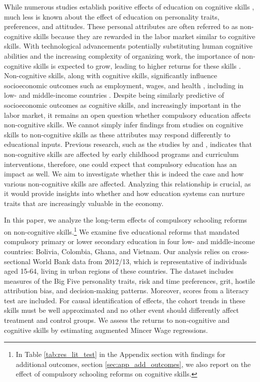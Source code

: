 
While numerous studies establish positive effects of education on cognitive skills \parencite[e.g.][]{schneeweis_does_2014, dahmann_how_2017, cappellari_effects_2023}, much less is known about the effect of education on personality traits, preferences, and attitudes. These personal attributes are often referred to as non-cognitive skills because they are rewarded in the labor market \parencite{bowles_incentive-enhancing_2001} similar to cognitive skills. With technological advancements potentially substituting human cognitive abilities and the increasing complexity of organizing work, the importance of non-cognitive skills is expected to grow, leading to higher returns for these skills \parencite{deming_growing_2017, edin_rising_2022}. Non-cognitive skills, along with cognitive skills, significantly influence socioeconomic outcomes such as employment, wages, and health \parencite{heckman_effects_2006, heckman_understanding_2013}, including in low- and middle-income countries \parencite{sharma_does_2018, gertler_labor_2014, glewwe_cognitive_2017}. Despite being similarly predictive of socioeconomic outcomes as cognitive skills, and increasingly important in the labor market, it remains an open question whether compulsory education affects non-cognitive skills. We cannot simply infer findings from studies on cognitive skills to non-cognitive skills as these attributes may respond differently to educational inputs. Previous research, such as the studies by \citet{heckman_understanding_2013} and \citet{alan_ever_2019}, indicates that non-cognitive skills are affected by early childhood programs and curriculum interventions, therefore, one could expect that compulsory education has an impact as well. We aim to investigate whether this is indeed the case and how various non-cognitive skills are affected. Analyzing this relationship is crucial, as it would provide insights into whether and how education systems can nurture traits that are increasingly valuable in the economy.


In this paper, we analyze the long-term effects of compulsory schooling reforms on non-cognitive skills.\footnote{
	In Table \ref{tab:res_lit_test} in the Appendix section with findings for additional outcomes, section \ref{sec:app_add_outcomes}, we also report on the effect of compulsory schooling reforms on cognitive skills.
} We examine five educational reforms that mandated compulsory primary or lower secondary education in four low- and middle-income countries: Bolivia, Colombia, Ghana, and Vietnam. Our analysis relies on cross-sectional World Bank data from 2012/13, which is representative of individuals aged 15-64, living in urban regions of these countries. The dataset includes measures of the Big Five personality traits, risk and time preferences, grit, hostile attribution bias, and decision-making patterns. Moreover, scores from a literacy test are included. For causal identification of effects, the cohort trends in these skills must be well approximated and no other event should differently affect treatment and control groups. We assess the returns to non-cognitive and cognitive skills by estimating augmented Mincer Wage regressions.


